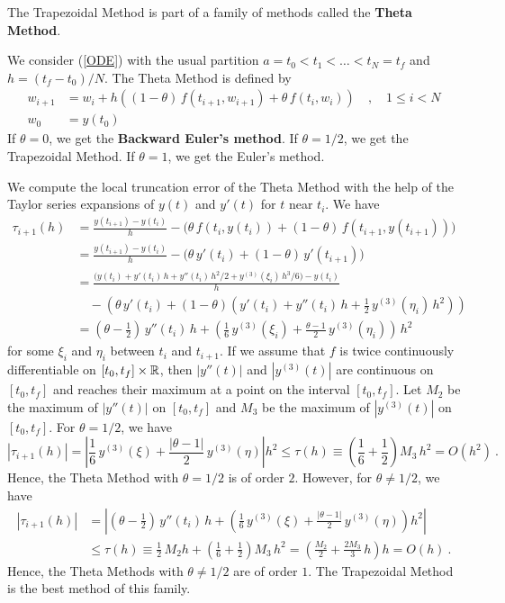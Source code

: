 \begin{rmk}
The Trapezoidal Method is part of a family of methods called the
{\bfseries Theta Method}.

We consider (\ref{ODE}) with the usual partition
$a=t_0 < t_1 < \ldots < t_N = t_f$ and $h=(t_f-t_0)/N$.
The Theta Method is defined by
\begin{align*}
w_{i+1} &= w_i + h \left( (1-\theta)\,f(t_{i+1},w_{i+1}) +
\theta\,f(t_i,w_i) \right)
\quad, \quad 1 \leq i < N \\
w_0 &= y(t_0)
\end{align*}
If $\theta = 0$, we get the
{\bfseries Backward Euler's method}.  If 
$\theta = 1/2$, we get the Trapezoidal Method.   If
$\theta = 1$, we get the Euler's method.

We compute the local truncation error of the Theta Method with the help of
the Taylor series expansions of $y(t)$ and $y'(t)$ for $t$ near $t_i$.
We have
\begin{align*}
\tau_{i+1}(h) &= \frac{y(t_{i+1}) - y(t_i)}{h} - \big(
\theta\,f(t_i,y(t_i)) + (1-\theta)\,f(t_{i+1},y(t_{i+1})) \big) \\
&= \frac{y(t_{i+1}) - y(t_i)}{h} -
\big( \theta\,y'(t_i) + (1-\theta)\,y'(t_{i+1}) \big) \\
&= \frac{ \big( y(t_i) + y'(t_i)\,h + y''(t_i)\,h^2/2 +
y^{(3)}(\xi_i)\,h^3/6 \big) - y(t_i)}{h} \\
& \quad - \left( \theta\,y'(t_i) + (1-\theta)
\left(  y'(t_i) + y''(t_i)\,h + \frac{1}{2}\,y^{(3)}(\eta_i)\,h^2
\right) \right) \\
&= \left( \theta-\frac{1}{2} \right)\,y''(t_i)\,h +
\left( \frac{1}{6}\,y^{(3)}(\xi_i) + \frac{\theta -1}{2}\,y^{(3)}(\eta_i)
\right) \, h^2
\end{align*}
for some $\xi_i$ and $\eta_i$ between $t_i$ and $t_{i+1}$.
If we assume that $f$ is twice continuously differentiable on
$[t_0,t_f]\times \mathbb{R}$, then $|y''(t)|$ and $|y^{(3)}(t)|$ are
continuous on $[t_0,t_f]$ and reaches their maximum at a point on the
interval $[t_0,t_f]$.  Let $M_2$ be the maximum of $|y''(t)|$ on
$[t_0,t_f]$ and $M_3$ be the maximum of $|y^{(3)}(t)|$ on $[t_0,t_f]$.
For $\theta = 1/2$, we have
\[
|\tau_{i+1}(h)|
= \left| \frac{1}{6}\,y^{(3)}(\xi) + \frac{|\theta -1|}{2}\,y^{(3)}(\eta)
\right| h^2 \leq \tau(h) \equiv
\left( \frac{1}{6} + \frac{1}{2} \right) M_3 \, h^2
= O(h^2) \ .
\]
Hence, the Theta Method with $\theta = 1/2$ is of order $2$.
However, for $\theta \neq 1/2$, we have
\begin{align*}
|\tau_{i+1}(h)|
& = \left| \left( \theta-\frac{1}{2} \right)\,y''(t_i)\,h
+ \left( \frac{1}{6}\,y^{(3)}(\xi) + \frac{|\theta -1|}{2}\,y^{(3)}(\eta)
\right) h^2 \right| \\
&\leq \tau(h) \equiv
\frac{1}{2}\,M_2 h + \left( \frac{1}{6} + \frac{1}{2} \right) M_3 \, h^2
= \left(\frac{M_2}{2} + \frac{2M_3}{3}\,h \right) h
= O(h) \ .
\end{align*}
Hence, the Theta Methods with $\theta \neq 1/2$ are of order $1$.
The Trapezoidal Method is the best method of this family.
\end{rmk}


